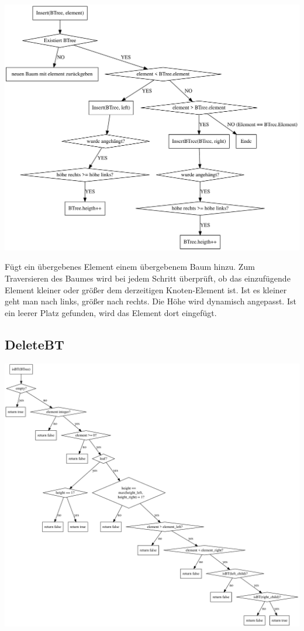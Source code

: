 \documentclass[11pt]{article}
\begin{document}
    \begin{center}
        \includegraphics[width=1.2\columnwidth] {insert}
    \end{center}

    Fügt ein übergebenes Element einem übergebenem Baum hinzu. Zum Traversieren des Baumes wird bei jedem Schritt überprüft, ob das einzufügende Element kleiner oder größer dem derzeitigen Knoten-Element ist. Ist es kleiner geht man nach links, größer nach rechts. Die Höhe wird dynamisch angepasst. Ist ein leerer Platz gefunden, wird das Element dort eingefügt.
    \subsection{DeleteBT}

    \begin{center}
        \includegraphics[width=1.2\columnwidth] {delete}
    \end{center}
\end{document}
